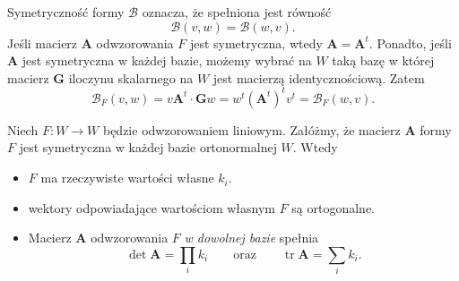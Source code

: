 \begin{uwaga}

Symetryczność formy $\mathcal{B}$ oznacza, że spełniona jest r\'owność
\[\mathcal{B}(v,w)=\mathcal{B}(w,v).\]
Jeśli macierz $\mathbf{A}$ odwzorowania $F$ jest symetryczna, wtedy 
$\mathbf{A}=\mathbf{A}^t$. Ponadto, jeśli $\mathbf{A}$ jest symetryczna w 
każdej bazie, możemy wybrać na $W$ taką bazę w kt\'orej macierz $\mathbf{G}$ 
iloczynu skalarnego na $W$ jest macierzą identycznościową. Zatem
\[\mathcal B_{F}(v,w)= v \mathbf{A}^t \cdot \mathbf{G} w= w^t \left(\mathbf{A}^t\right)^t v^t=\mathcal{B}_{F}(w,v).\]

\end{uwaga}


\begin{frame}[<+->]

\end{frame}


\begin{frame}[<+->]

\begin{lemat}\label{lem:alg-lin-2-eigen}
Niech $F\colon W\to W$ będzie odwzorowaniem liniowym. Załóżmy, że macierz $\mathbf{A}$ formy $F$ jest symetryczna w każdej bazie ortonormalnej $W$.
Wtedy

\begin{itemize}
\item $F$ ma rzeczywiste wartości własne $k_i$.
\item wektory odpowiadające wartościom własnym $F$ są ortogonalne.
\item Macierz $\mathbf{A}$ odwzorowania $F$ \textit{w dowolnej bazie} spełnia
\[\det \mathbf{A}=\prod_i k_i\qquad \text{oraz}\qquad \operatorname{tr} \mathbf{A}=\sum_i k_i.\]

\end{itemize}
\end{lemat}

\end{frame}

